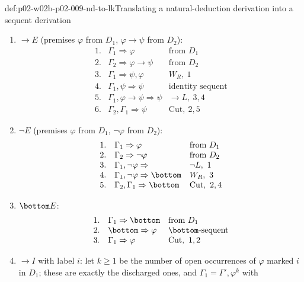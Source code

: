 \begin{hbmethod}{def:p02-w02b-p02-009-nd-to-lk}{Translating a natural-deduction derivation into a sequent derivation}
\begin{enumerate}
    and let \(W_R\) add \(\varphi\)):
    \[
    \begin{array}{rll}
    1.&\Gamma_1\Rightarrow\varphi&\text{from }D_1\\
    2.&\Gamma_1\Rightarrow\varphi,\psi&W_R,\ 1\\
    3.&\Gamma_1\Rightarrow\varphi\lor\psi&\lor R,\ 2
    \end{array}
    \]
  \item \(\to E\) (premises \(\varphi\) from \(D_1\), \(\varphi\to\psi\) from
    \(D_2\)):
    \[
    \begin{array}{rll}
    1.&\Gamma_1\Rightarrow\varphi&\text{from }D_1\\
    2.&\Gamma_2\Rightarrow\varphi\to\psi&\text{from }D_2\\
    3.&\Gamma_1\Rightarrow\psi,\varphi&W_R,\ 1\\
    4.&\Gamma_1,\psi\Rightarrow\psi&\text{identity sequent}\\
    5.&\Gamma_1,\varphi\to\psi\Rightarrow\psi&\to L,\ 3,4\\
    6.&\Gamma_2,\Gamma_1\Rightarrow\psi&\mathrm{Cut},\ 2,5
    \end{array}
    \]
  \item \(\neg E\) (premises \(\varphi\) from \(D_1\), \(\neg\varphi\) from
    \(D_2\)):
    \[
    \begin{array}{rll}
    1.&\Gamma_1\Rightarrow\varphi&\text{from }D_1\\
    2.&\Gamma_2\Rightarrow\neg\varphi&\text{from }D_2\\
    3.&\Gamma_1,\neg\varphi\Rightarrow{}&\neg L,\ 1\\
    4.&\Gamma_1,\neg\varphi\Rightarrow\bottom&W_R,\ 3\\
    5.&\Gamma_2,\Gamma_1\Rightarrow\bottom&\mathrm{Cut},\ 2,4
    \end{array}
    \]
  \item \(\bottom E\):
    \[
    \begin{array}{rll}
    1.&\Gamma_1\Rightarrow\bottom&\text{from }D_1\\
    2.&\bottom\Rightarrow\varphi&\bottom\text{-sequent}\\
    3.&\Gamma_1\Rightarrow\varphi&\mathrm{Cut},\ 1,2
    \end{array}
    \]
  \item \(\to I\) with label \(i\): let \(k\geq1\) be the number of open
    occurrences of \(\varphi\) marked \(i\) in \(D_1\); these are exactly the
    discharged ones, and \(\Gamma_1=\Gamma',\varphi^{k}\) with

\end{enumerate}
\end{hbmethod}
